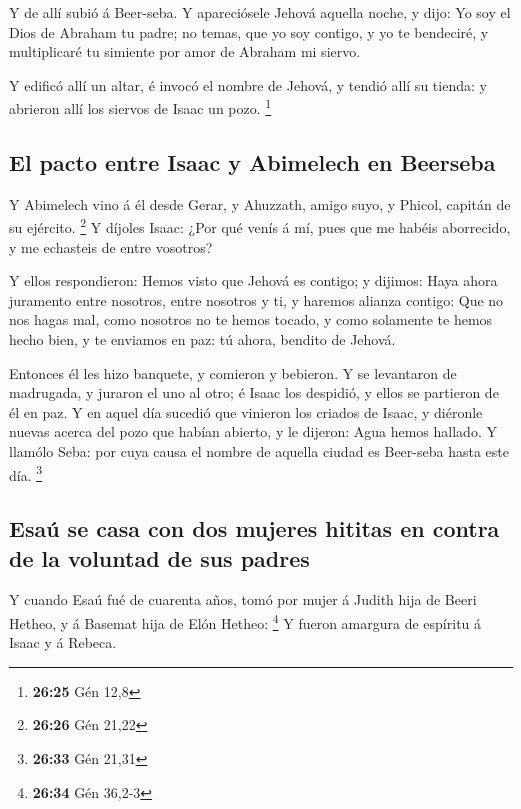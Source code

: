  Y de allí subió á Beer-seba.  Y
apareciósele Jehová aquella noche, y dijo: Yo soy el Dios de Abraham tu
padre; no temas, que yo soy contigo, y yo te bendeciré, y multiplicaré
tu simiente por amor de Abraham mi siervo.

 Y edificó allí un altar, é invocó el nombre de Jehová, y
tendió allí su tienda: y abrieron allí los siervos de Isaac un pozo.
\footnote{\textbf{26:25} Gén 12,8}

\hypertarget{el-pacto-entre-isaac-y-abimelech-en-beerseba}{%
\subsection{El pacto entre Isaac y Abimelech en
Beerseba}\label{el-pacto-entre-isaac-y-abimelech-en-beerseba}}

 Y Abimelech vino á él desde Gerar, y Ahuzzath, amigo
suyo, y Phicol, capitán de su ejército. \footnote{\textbf{26:26} Gén
  21,22}  Y díjoles Isaac: ¿Por qué venís á mí, pues que
me habéis aborrecido, y me echasteis de entre vosotros?

 Y ellos respondieron: Hemos visto que Jehová es contigo;
y dijimos: Haya ahora juramento entre nosotros, entre nosotros y ti, y
haremos alianza contigo:  Que no nos hagas mal, como
nosotros no te hemos tocado, y como solamente te hemos hecho bien, y te
enviamos en paz: tú ahora, bendito de Jehová.

 Entonces él les hizo banquete, y comieron y bebieron.
 Y se levantaron de madrugada, y juraron el uno al otro;
é Isaac los despidió, y ellos se partieron de él en paz. 
Y en aquel día sucedió que vinieron los criados de Isaac, y diéronle
nuevas acerca del pozo que habían abierto, y le dijeron: Agua hemos
hallado.  Y llamólo Seba: por cuya causa el nombre de
aquella ciudad es Beer-seba hasta este día. \footnote{\textbf{26:33} Gén
  21,31}

\hypertarget{esauxfa-se-casa-con-dos-mujeres-hititas-en-contra-de-la-voluntad-de-sus-padres}{%
\subsection{Esaú se casa con dos mujeres hititas en contra de la
voluntad de sus
padres}\label{esauxfa-se-casa-con-dos-mujeres-hititas-en-contra-de-la-voluntad-de-sus-padres}}

 Y cuando Esaú fué de cuarenta años, tomó por mujer á
Judith hija de Beeri Hetheo, y á Basemat hija de Elón Hetheo:
\footnote{\textbf{26:34} Gén 36,2-3}  Y fueron amargura
de espíritu á Isaac y á Rebeca.

